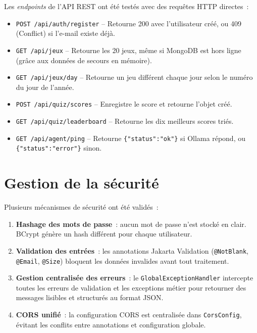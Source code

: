 Les \textit{endpoints} de l'API REST ont été testés avec des requêtes HTTP directes~:

\begin{itemize}
    \item \texttt{POST /api/auth/register} -- Retourne 200 avec l'utilisateur créé,
          ou 409 (Conflict) si l'e-mail existe déjà.
    \item \texttt{GET /api/jeux} -- Retourne les 20 jeux, même si MongoDB est hors ligne
          (grâce aux données de secours en mémoire).
    \item \texttt{GET /api/jeux/day} -- Retourne un jeu différent chaque jour selon le
          numéro du jour de l'année.
    \item \texttt{POST /api/quiz/scores} -- Enregistre le score et retourne l'objet créé.
    \item \texttt{GET /api/quiz/leaderboard} -- Retourne les dix meilleurs scores triés.
    \item \texttt{GET /api/agent/ping} -- Retourne \texttt{\{"status":"ok"\}} si Ollama répond,
          ou \texttt{\{"status":"error"\}} sinon.
\end{itemize}

\section{Gestion de la sécurité}

Plusieurs mécanismes de sécurité ont été validés~:

\begin{enumerate}
    \item \textbf{Hashage des mots de passe}~: aucun mot de passe n'est stocké en clair.
          BCrypt génère un hash différent pour chaque utilisateur.

    \item \textbf{Validation des entrées}~: les annotations Jakarta Validation (\texttt{@NotBlank},
          \texttt{@Email}, \texttt{@Size}) bloquent les données invalides avant tout traitement.

    \item \textbf{Gestion centralisée des erreurs}~: le \texttt{GlobalExceptionHandler} intercepte
          toutes les erreurs de validation et les exceptions métier pour retourner des messages
          lisibles et structurés au format JSON.

    \item \textbf{CORS unifié}~: la configuration CORS est centralisée dans \texttt{CorsConfig},
          évitant les conflits entre annotations et configuration globale.
\end{enumerate}

